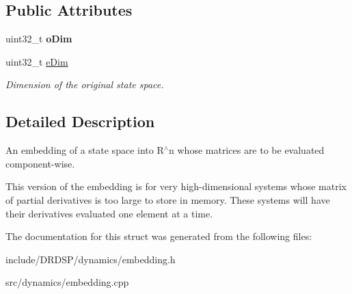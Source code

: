 \subsection*{Public Attributes}
\begin{DoxyCompactItemize}
\item 
\hypertarget{struct_d_r_d_s_p_1_1_embedding_c_w_aa3f8538fb8f9341f744f79a2bda8d8ef}{uint32\-\_\-t {\bfseries o\-Dim}}\label{struct_d_r_d_s_p_1_1_embedding_c_w_aa3f8538fb8f9341f744f79a2bda8d8ef}

\item 
\hypertarget{struct_d_r_d_s_p_1_1_embedding_c_w_ade05f2b8835edeb8b418bcd27d2d74db}{uint32\-\_\-t \hyperlink{struct_d_r_d_s_p_1_1_embedding_c_w_ade05f2b8835edeb8b418bcd27d2d74db}{e\-Dim}}\label{struct_d_r_d_s_p_1_1_embedding_c_w_ade05f2b8835edeb8b418bcd27d2d74db}

\begin{DoxyCompactList}\small\item\em Dimension of the original state space. \end{DoxyCompactList}\end{DoxyCompactItemize}


\subsection{Detailed Description}
An embedding of a state space into R$^\wedge$n whose matrices are to be evaluated component-\/wise. 

This version of the embedding is for very high-\/dimensional systems whose matrix of partial derivatives is too large to store in memory. These systems will have their derivatives evaluated one element at a time. 

The documentation for this struct was generated from the following files\-:\begin{DoxyCompactItemize}
\item 
include/\-D\-R\-D\-S\-P/dynamics/embedding.\-h\item 
src/dynamics/embedding.\-cpp\end{DoxyCompactItemize}
